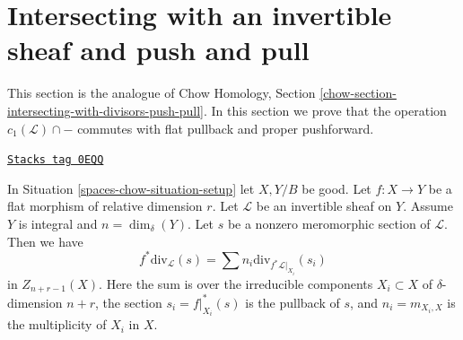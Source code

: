 \section{Intersecting with an invertible sheaf and push and pull}
\label{spaces-chow-section-intersecting-with-divisors-push-pull}
This section is the analogue of
Chow Homology, Section \ref{chow-section-intersecting-with-divisors-push-pull}.
In this section we prove that the operation $c_1(\mathcal{L}) \cap -$
commutes with flat pullback and proper pushforward.

\begin{lemma}
\label{spaces-chow-lemma-prepare-flat-pullback-cap-c1}
\href{https://stacks.math.columbia.edu/tag/0EQQ}{\texttt{Stacks tag 0EQQ}}

In Situation \ref{spaces-chow-situation-setup} let $X, Y/B$ be good.
Let $f : X \to Y$ be a flat morphism of relative dimension $r$.
Let $\mathcal{L}$ be an invertible sheaf on $Y$.
Assume $Y$ is integral and $n = \dim_\delta(Y)$.
Let $s$ be a nonzero meromorphic section of $\mathcal{L}$.
Then we have
$$
f^*\text{div}_\mathcal{L}(s) = \sum n_i\text{div}_{f^*\mathcal{L}|_{X_i}}(s_i)
$$
in $Z_{n + r - 1}(X)$. Here the sum is over the irreducible
components $X_i \subset X$ of $\delta$-dimension $n + r$,
the section $s_i = f|_{X_i}^*(s)$ is the pullback of $s$, and
$n_i = m_{X_i, X}$ is the multiplicity of $X_i$ in $X$.
\end{lemma}

